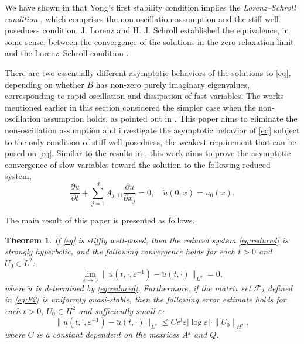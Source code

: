 \documentclass{article}
\theoremstyle{plain}%
\newtheorem{theorem}{Theorem}%
\theoremstyle{definition}%
\theoremstyle{remark}%
\newcommand{\cF}{\mathcal{F}}
\newcommand{\+}[1]{{\bm{#1}}}
\newcommand{\eps}{\varepsilon}
\newcommand{\pd}[2]{\dfrac{\partial{#1}}{\partial{#2}}}
\begin{document}
We have shown in 
that Yong's first stability condition implies the 
\textit{Lorenz--Schroll condition} \cite{lorenz_stiff_1997}, which 
comprises the non-oscillation assumption and the stiff 
well-posedness condition. J. Lorenz and H. J. Schroll established 
the equivalence, in some sense, between the convergence of the 
solutions in the zero relaxation limit and the Lorenz--Schroll 
condition \cite{lorenz_stiff_1997}.

There are two essentially different asymptotic behaviors of 
the solutions to \cref{eq}, depending 
on whether $B$ has non-zero purely imaginary eigenvalues,
corresponding to rapid oscillation and dissipation of fast 
variables.
The works mentioned earlier in this section considered 
the simpler case when the non-oscillation assumption holds, 
as pointed out in \cite{Yong_basic_2002}. 
This paper aims to eliminate the non-oscillation 
assumption and investigate the asymptotic behavior of \cref{eq} 
subject to the only condition of stiff well-posedness, 
the weakest requirement that can be posed on \cref{eq}.
Similar to the results in 
\cite{lorenz_stiff_1997,Yong_singular_1999}, 
this work aims to prove the asymptotic convergence of slow 
variables toward the solution to the following reduced system, 
\begin{equation}\label{eq:reduced}
  \pd{\breve{u}}{t} + \sum_{j = 1}^{d} A_{j,11} \pd{\breve{u}}{x_j} = 
  0, \quad \breve{u}(0, x) = u_0(x).
\end{equation}

The main result of this paper is presented as follows.

\begin{theorem}\label{thm}
  If \cref{eq} is stiffly well-posed, then the reduced system 
  \eqref{eq:reduced} is strongly hyperbolic, and the following 
  convergence holds for each $t > 0$ and $U_0 \in L^2$:
  \begin{displaymath}
    \lim \limits_{\eps \to 0} 
    \| u(t, \cdot, \eps^{-1}) - \breve{u}(t, \cdot) 
    \|_{L^2} = 0,
  \end{displaymath}
  where $\breve{u}$ is determined by \cref{eq:reduced}.
  Furthermore, if the matrix set $\cF_2$ defined in \cref{eq:F2}
  is uniformly quasi-stable,
  then the following error estimate holds for each $t > 0$, 
  $U_0 \in H^2$ and sufficiently small $\eps$:
  \begin{displaymath}
    \| u(t, \cdot, \eps^{-1}) - \breve{u}(t, \cdot) 
    \|_{L^2} 
    \le C e^t \eps |\log \eps| \cdot \|U_0\|_{H^2},
  \end{displaymath}
  where $C$ is a constant dependent on the matrices $A^j$ and $Q$.
\end{theorem}
\end{document}
